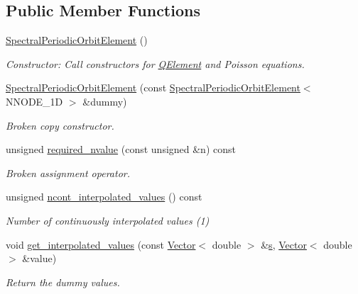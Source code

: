 \subsection*{Public Member Functions}
\begin{DoxyCompactItemize}
\item 
\hyperlink{classoomph_1_1SpectralPeriodicOrbitElement_ae1eefbd43491bf3437a81c8096dd9fb1}{Spectral\+Periodic\+Orbit\+Element} ()
\begin{DoxyCompactList}\small\item\em Constructor\+: Call constructors for \hyperlink{classoomph_1_1QElement}{Q\+Element} and Poisson equations. \end{DoxyCompactList}\item 
\hyperlink{classoomph_1_1SpectralPeriodicOrbitElement_ab700f3cb2925783af85c42080be87554}{Spectral\+Periodic\+Orbit\+Element} (const \hyperlink{classoomph_1_1SpectralPeriodicOrbitElement}{Spectral\+Periodic\+Orbit\+Element}$<$ N\+N\+O\+D\+E\+\_\+1D $>$ \&dummy)
\begin{DoxyCompactList}\small\item\em Broken copy constructor. \end{DoxyCompactList}\item 
unsigned \hyperlink{classoomph_1_1SpectralPeriodicOrbitElement_aa4f3fa783000d6912503de77cf06f2ca}{required\+\_\+nvalue} (const unsigned \&n) const
\begin{DoxyCompactList}\small\item\em Broken assignment operator. \end{DoxyCompactList}\item 
unsigned \hyperlink{classoomph_1_1SpectralPeriodicOrbitElement_a7a1e61b3aa06a7402448215c6b99dcc3}{ncont\+\_\+interpolated\+\_\+values} () const
\begin{DoxyCompactList}\small\item\em Number of continuously interpolated values (1) \end{DoxyCompactList}\item 
void \hyperlink{classoomph_1_1SpectralPeriodicOrbitElement_a1b1076948e9f8c8a033dc576d9b41536}{get\+\_\+interpolated\+\_\+values} (const \hyperlink{classoomph_1_1Vector}{Vector}$<$ double $>$ \&\hyperlink{cfortran_8h_ab7123126e4885ef647dd9c6e3807a21c}{s}, \hyperlink{classoomph_1_1Vector}{Vector}$<$ double $>$ \&value)
\begin{DoxyCompactList}\small\item\em Return the dummy values. \end{DoxyCompactList}\item 

\end{DoxyCompactItemize}

